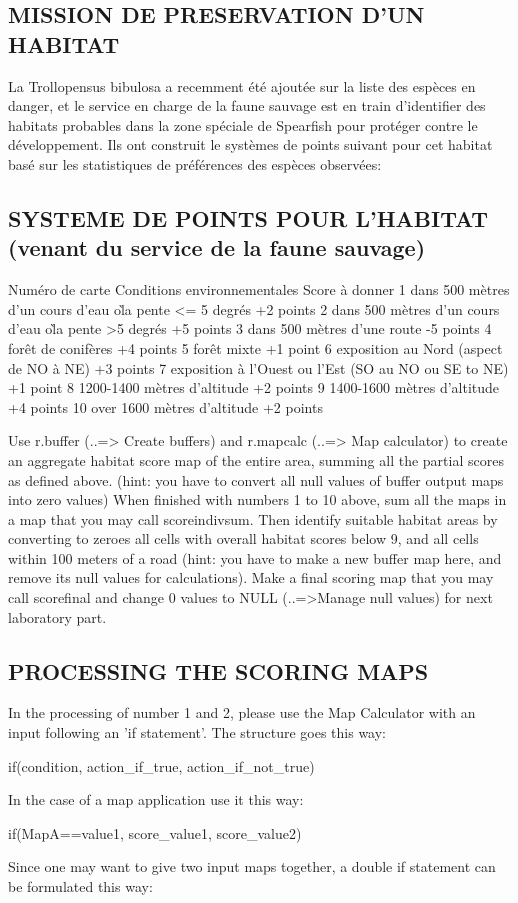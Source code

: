 \subsection{MISSION DE PRESERVATION D'UN HABITAT}
La Trollopensus bibulosa a recemment \'et\'e ajout\'ee sur la liste des esp\`eces en danger, et le service en charge de la faune sauvage est en train d'identifier des habitats probables dans la zone sp\'eciale de Spearfish pour prot\'eger contre le d\'eveloppement. Ils ont construit le syst\`emes de points suivant pour cet habitat bas\'e sur les statistiques de pr\'ef\'erences des esp\`eces observ\'ees:

\subsection{SYSTEME DE POINTS POUR L'HABITAT (venant du service de la faune sauvage) }

Num\'ero de carte Conditions environnementales Score \`a donner
1 dans 500 m\`etres d'un cours d'eau o\` la pente <= 5 degr\'es +2 points
2 dans 500 m\`etres d'un cours d'eau o\` la pente >5 degr\'es +5 points
3 dans 500 m\`etres d'une route -5 points
4 for\^et de conif\`eres +4 points
5 for\^et mixte +1 point
6 exposition au Nord (aspect de NO \`a NE) +3 points
7 exposition \`a l'Ouest ou l'Est (SO au NO ou SE to NE) +1 point
8 1200-1400 m\`etres d'altitude +2 points
9 1400-1600 m\`etres d'altitude +4 points
10 over 1600 m\`etres d'altitude +2 points

Use r.buffer (..=> Create buffers) and r.mapcalc (..=> Map calculator) to create an aggregate habitat score map of the entire area, summing all the partial scores as defined above. (hint: you have to convert all null values of buffer output maps into zero values)
When finished with numbers 1 to 10 above, sum all the maps in a map that you may call scoreindivsum. Then identify suitable habitat areas by converting to zeroes all cells with overall habitat scores below 9, and all cells within 100 meters of a road (hint: you have to make a new buffer map here, and remove its null values for calculations). Make a final scoring map that you may call scorefinal and change 0 values to NULL (..=>Manage null values) for next laboratory part.

\subsection{PROCESSING THE SCORING MAPS}

In the processing of number 1 and 2, please use the Map Calculator with an input following an 'if statement'. The structure goes this
way:
\begin{smallverbatim}
if(condition, action_if_true, action_if_not_true)
\end{smallverbatim}
In the case of a map application use it this way:
\begin{smallverbatim}
if(MapA==value1, score_value1, score_value2)
\end{smallverbatim}
Since one may want to give two input maps together, a double if statement can be formulated this way:

